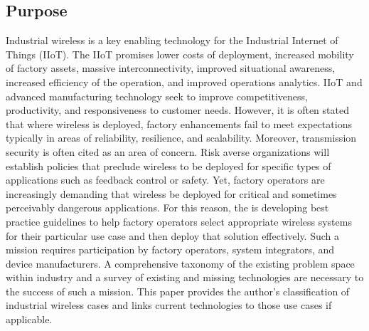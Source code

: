     \subsection{Purpose}
    Industrial wireless is a key enabling technology for the Industrial Internet of Things (IIoT).  The IIoT promises lower costs of deployment, increased mobility of factory assets, massive interconnectivity, improved situational awareness, increased efficiency of the operation, and improved operations analytics.  IIoT and advanced manufacturing technology seek to improve competitiveness, productivity, and responsiveness to customer needs. However, it is often stated that where wireless is deployed, factory enhancements fail to meet expectations typically in areas of reliability, resilience, and scalability. Moreover, transmission security is often cited as an area of concern. Risk averse organizations will establish policies that preclude wireless to be deployed for specific types of applications such as feedback control or safety. Yet, factory operators are increasingly demanding that wireless be deployed for critical and sometimes perceivably dangerous applications.  For this reason, the
\iftoggle{blindcopy}{(BLIND COPY - NAME REMOVED)}{National Institute of Standards and Technology (NIST)} 
is developing best practice guidelines to help factory operators select appropriate wireless systems for their particular use case and then deploy that solution effectively.  Such a mission requires participation by factory operators, system integrators, and device manufacturers. A comprehensive taxonomy of the existing problem space within industry and a survey of existing and missing technologies are necessary to the success of such a mission. This paper provides the author's classification of industrial wireless cases and links current technologies to those use cases if applicable. 
    
